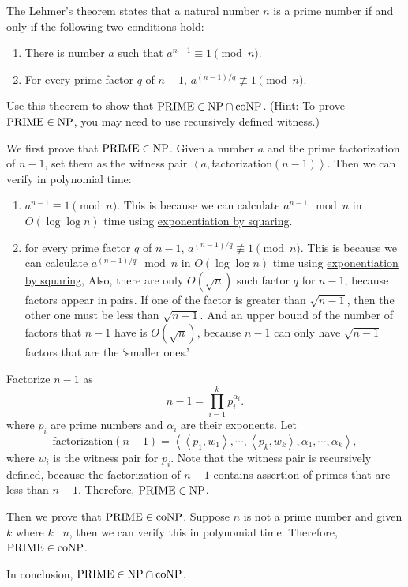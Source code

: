 \documentclass{homework}
\begin{document}
\begin{problem}
  The Lehmer's theorem states that a natural number $n$ is a prime number if and
  only if the following two conditions hold:
  \begin{enumerate}
    \item There is number $a$ such that $a^{n-1} \equiv 1 \pmod{n}$.
    \item For every prime factor $q$ of $n-1$, $a^{(n-1)/q} \not\equiv 1 \pmod{n}$.
  \end{enumerate}
  Use this theorem to show that $\mathrm{PRIME} \in \textup{NP} \cap \textup{coNP}$.
  (Hint: To prove $\mathrm{PRIME} \in \textup{NP}$, you may need to use recursively defined
  witness.)
\end{problem}

\begin{solution}

  We first prove that $\mathrm{PRIME} \in \textup{NP}$.
  Given a number $a$ and the prime factorization of $n-1$,
  set them as the witness pair $\left<a, \text{factorization}(n - 1)\right>$.
  Then we can verify in polynomial time:
  \begin{enumerate}
    \item $a^{n - 1} \equiv 1 \pmod{n}$.
      This is because we can calculate $a^{n-1} \mod n$ in $O(\log\log n)$ time
      using \href{https://en.wikipedia.org/wiki/Exponentiation_by_squaring}{exponentiation by squaring}.
    \item for every prime factor $q$ of $n-1$, $a^{(n-1)/q} \not\equiv 1 \pmod{n}$.
      This is because we can calculate $a^{(n-1)/q} \mod n$ in $O(\log\log n)$ time
      using \href{https://en.wikipedia.org/wiki/Exponentiation_by_squaring}{exponentiation by squaring},
      Also, there are only $O(\sqrt{n})$ such factor $q$ for $n - 1$,
      because factors appear in pairs.
      If one of the factor is greater than $\sqrt{n - 1}$,
      then the other one must be less than $\sqrt{n - 1}$.
      And an upper bound of the number of factors that $n - 1$ have is $O(\sqrt{n})$,
      because $n - 1$ can only have $\sqrt{n - 1}$ factors that are the `smaller ones.'
  \end{enumerate}
  Factorize $n - 1$ as
  \begin{equation*}
    n - 1 = \prod_{i = 1}^k p_i^{\alpha_i}.
  \end{equation*}
  where $p_i$ are prime numbers and $\alpha_i$ are their exponents.
  Let
  \begin{equation*}
    \text{factorization}(n - 1) = \left<\left<p_1, w_1\right>, \cdots, \left<p_k, w_k\right>, \alpha_1, \cdots, \alpha_k\right>,
  \end{equation*}
  where $w_i$ is the witness pair for $p_i$.
  Note that the witness pair is recursively defined,
  because the factorization of $n - 1$ contains assertion of primes
  that are less than $n - 1$.
  Therefore, $\mathrm{PRIME} \in \textup{NP}$.

  Then we prove that $\mathrm{PRIME} \in \textup{coNP}$. Suppose $n$ is not a prime number
  and given $k$ where $k \mid n$, then we can verify this in polynomial time.
  Therefore, $\mathrm{PRIME} \in \textup{coNP}$.

  In conclusion, $\mathrm{PRIME} \in \textup{NP} \cap \textup{coNP}$.

\end{solution}
\end{document}
